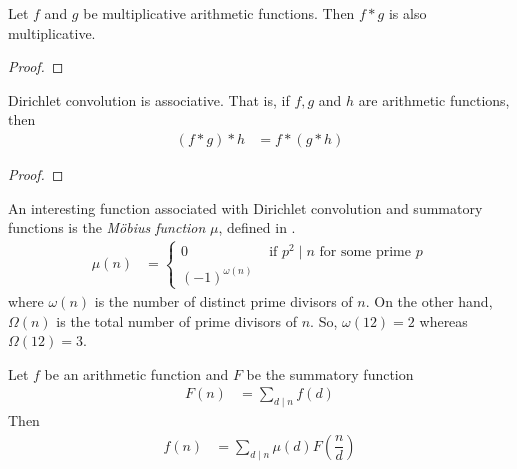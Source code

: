 \documentclass[elemannt.tex]{subfile}
\begin{document}
		\begin{theorem}
			Let $f$ and $g$ be multiplicative arithmetic functions. Then $f\ast g$ is also multiplicative.
		\end{theorem}
	
		\begin{proof}
			
		\end{proof}
	
		\begin{theorem}\label{thm:convass}
			Dirichlet convolution is associative. That is, if $f,g$ and $h$ are arithmetic functions, then
				\begin{align*}
					(f\ast g)\ast h
						& = f\ast (g\ast h)
				\end{align*}
		\end{theorem}
	
		\begin{proof}
			
		\end{proof}
	 An interesting function associated with Dirichlet convolution and summatory functions is the \textit{M\"{o}bius function} $\mu$, defined in \textcite{mobius_1832}.
		\begin{align*}
			\mu(n)
				& =
					\begin{cases}
						0& \mbox{ if }p^{2}\mid n\mbox{ for some prime }p\\
						(-1)^{\omega(n)}
					\end{cases}
		\end{align*}
	where $\omega(n)$ is the number of distinct prime divisors of $n$. On the other hand, $\Omega(n)$ is the total number of prime divisors of $n$. So, $\omega(12)=2$ whereas $\Omega(12)=3$.
		\begin{theorem}\label{thm:mobinv}
			Let $f$ be an arithmetic function and $F$ be the summatory function
				\begin{align*}
					F(n)
					& = \sum_{d\mid n}f(d)
				\end{align*}
			Then
				\begin{align*}
					f(n)
						& = \sum_{d\mid n}\mu(d)F\left(\dfrac{n}{d}\right)
				\end{align*}
		\end{theorem}
		
\end{document}
